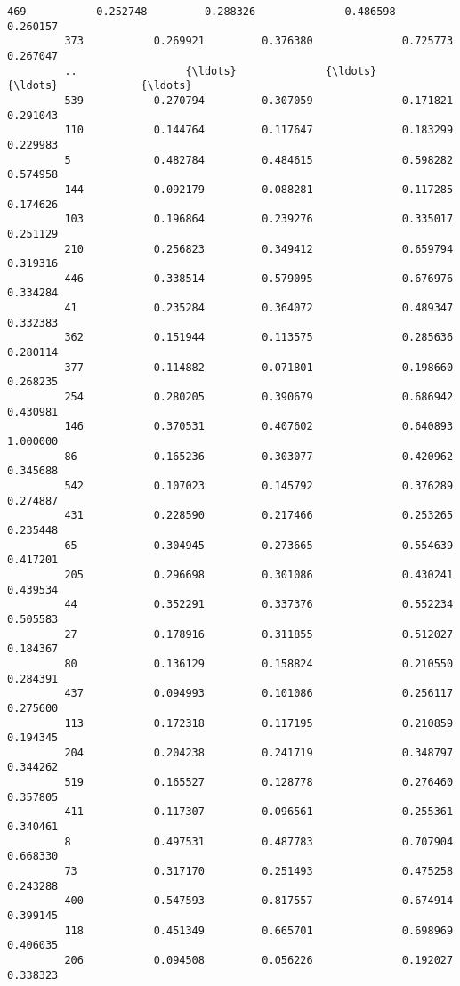 \documentclass[11pt]{article}
\begin{document}
\begin{Verbatim}[commandchars=\\\{\}]
         469           0.252748         0.288326              0.486598        0.260157   
         373           0.269921         0.376380              0.725773        0.267047   
         ..                 {\ldots}              {\ldots}                   {\ldots}             {\ldots}   
         539           0.270794         0.307059              0.171821        0.291043   
         110           0.144764         0.117647              0.183299        0.229983   
         5             0.482784         0.484615              0.598282        0.574958   
         144           0.092179         0.088281              0.117285        0.174626   
         103           0.196864         0.239276              0.335017        0.251129   
         210           0.256823         0.349412              0.659794        0.319316   
         446           0.338514         0.579095              0.676976        0.334284   
         41            0.235284         0.364072              0.489347        0.332383   
         362           0.151944         0.113575              0.285636        0.280114   
         377           0.114882         0.071801              0.198660        0.268235   
         254           0.280205         0.390679              0.686942        0.430981   
         146           0.370531         0.407602              0.640893        1.000000   
         86            0.165236         0.303077              0.420962        0.345688   
         542           0.107023         0.145792              0.376289        0.274887   
         431           0.228590         0.217466              0.253265        0.235448   
         65            0.304945         0.273665              0.554639        0.417201   
         205           0.296698         0.301086              0.430241        0.439534   
         44            0.352291         0.337376              0.552234        0.505583   
         27            0.178916         0.311855              0.512027        0.184367   
         80            0.136129         0.158824              0.210550        0.284391   
         437           0.094993         0.101086              0.256117        0.275600   
         113           0.172318         0.117195              0.210859        0.194345   
         204           0.204238         0.241719              0.348797        0.344262   
         519           0.165527         0.128778              0.276460        0.357805   
         411           0.117307         0.096561              0.255361        0.340461   
         8             0.497531         0.487783              0.707904        0.668330   
         73            0.317170         0.251493              0.475258        0.243288   
         400           0.547593         0.817557              0.674914        0.399145   
         118           0.451349         0.665701              0.698969        0.406035   
         206           0.094508         0.056226              0.192027        0.338323   
         

\end{Verbatim}
\end{document}
